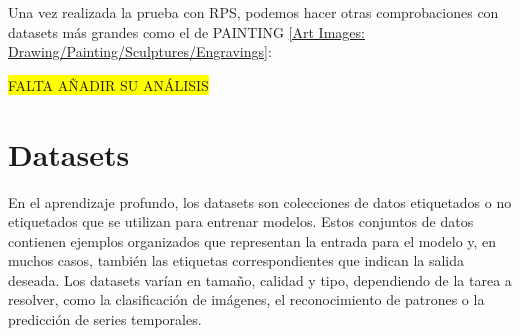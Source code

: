 Una vez realizada la prueba con RPS, podemos hacer otras comprobaciones con datasets más grandes como el de PAINTING
\hyperref[subsec:painting]{[Art Images: Drawing/Painting/Sculptures/Engravings]}:
\begin{table}[htp]
    \centering
    \caption{Resultados de todos los algoritmos para PAINTING con la nueva mutación usando \textbf{MobileNet}}
    \label{tab:generation-painting-with-new-mutation}
\end{table}

\colorbox{yellow}{FALTA AÑADIR SU ANÁLISIS}


\section{Datasets}\label{sec:datasets}
En el aprendizaje profundo, los datasets son colecciones de datos etiquetados o no etiquetados que se utilizan para
entrenar modelos.
Estos conjuntos de datos contienen ejemplos organizados que representan la entrada para el modelo y, en muchos casos,
también las etiquetas correspondientes que indican la salida deseada.
Los datasets varían en tamaño, calidad y tipo, dependiendo de la tarea a resolver, como la clasificación de imágenes,
el reconocimiento de patrones o la predicción de series temporales. \\[6pt]

